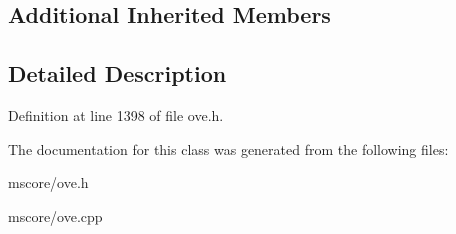 \subsection*{Additional Inherited Members}


\subsection{Detailed Description}


Definition at line 1398 of file ove.\+h.



The documentation for this class was generated from the following files\+:\begin{DoxyCompactItemize}
\item 
mscore/ove.\+h\item 
mscore/ove.\+cpp\end{DoxyCompactItemize}
